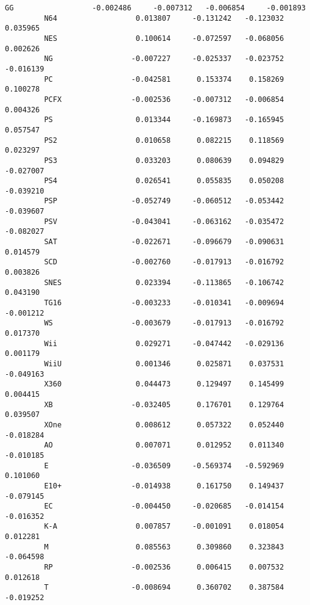 \documentclass[11pt]{article}
\begin{document}
\begin{Verbatim}[commandchars=\\\{\}]
         GG                  -0.002486     -0.007312   -0.006854     -0.001893   
         N64                  0.013807     -0.131242   -0.123032      0.035965   
         NES                  0.100614     -0.072597   -0.068056      0.002626   
         NG                  -0.007227     -0.025337   -0.023752     -0.016139   
         PC                  -0.042581      0.153374    0.158269      0.100278   
         PCFX                -0.002536     -0.007312   -0.006854      0.004326   
         PS                   0.013344     -0.169873   -0.165945      0.057547   
         PS2                  0.010658      0.082215    0.118569      0.023297   
         PS3                  0.033203      0.080639    0.094829     -0.027007   
         PS4                  0.026541      0.055835    0.050208     -0.039210   
         PSP                 -0.052749     -0.060512   -0.053442     -0.039607   
         PSV                 -0.043041     -0.063162   -0.035472     -0.082027   
         SAT                 -0.022671     -0.096679   -0.090631      0.014579   
         SCD                 -0.002760     -0.017913   -0.016792      0.003826   
         SNES                 0.023394     -0.113865   -0.106742      0.043190   
         TG16                -0.003233     -0.010341   -0.009694     -0.001212   
         WS                  -0.003679     -0.017913   -0.016792      0.017370   
         Wii                  0.029271     -0.047442   -0.029136      0.001179   
         WiiU                 0.001346      0.025871    0.037531     -0.049163   
         X360                 0.044473      0.129497    0.145499      0.004415   
         XB                  -0.032405      0.176701    0.129764      0.039507   
         XOne                 0.008612      0.057322    0.052440     -0.018284   
         AO                   0.007071      0.012952    0.011340     -0.010185   
         E                   -0.036509     -0.569374   -0.592969      0.101060   
         E10+                -0.014938      0.161750    0.149437     -0.079145   
         EC                  -0.004450     -0.020685   -0.014154     -0.016352   
         K-A                  0.007857     -0.001091    0.018054      0.012281   
         M                    0.085563      0.309860    0.323843     -0.064598   
         RP                  -0.002536      0.006415    0.007532      0.012618   
         T                   -0.008694      0.360702    0.387584     -0.019252   
         

\end{Verbatim}
\end{document}
